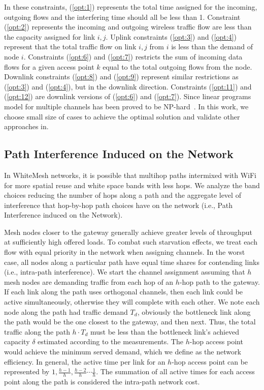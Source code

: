 In these constraints, (\ref{opt:1}) represents the total time assigned for the incoming, outgoing flows 
and the interfering time should all be less than 1. Constraint (\ref{opt:2}) represents the incoming and 
outgoing wireless traffic flow are less than the capacity assigned for link $i,j$. Uplink constraints 
(\ref{opt:3}) and (\ref{opt:4}) represent that the total traffic flow on link $i,j$ from $i$ is less than 
the demand of node $i$. Constraints (\ref{opt:6}) and (\ref{opt:7}) restricts the sum of incoming data 
flows for a given access point $k$ equal to the total outgoing flows from the node. Downlink constraints 
(\ref{opt:8}) and (\ref{opt:9}) represent similar restrictions as (\ref{opt:3}) and (\ref{opt:4}), but 
in the downlink direction.  Constraints (\ref{opt:11}) and (\ref{opt:12}) are downlink versions of 
(\ref{opt:6}) and (\ref{opt:7}).
Since linear programs model for multiple channels has been proved to be NP-hard~\cite{yuan2006cross}. 
In this work, we choose small size of cases to achieve the optimal solution and validate other
approaches in.






%
\subsection{Path Interference Induced on the Network}
\label{subsec:PEN}

In WhiteMesh networks, it is possible that multihop paths intermixed with WiFi for more spatial reuse 
and white space bands with less hops. We analyze the band choices reducing the number of hops along 
a path and the aggregate level of interference that hop-by-hop path choices have on the network (i.e., Path 
Interference induced on the Network).

Mesh nodes closer to the gateway generally achieve greater levels of throughput at sufficiently high 
offered loads. To combat such starvation effects, we treat each flow with equal priority in the network 
when assigning channels. In the worst case, all nodes along a particular path have equal time shares for 
contending links (i.e., intra-path interference). We start the channel assignment assuming that $h$ mesh 
nodes are demanding traffic from each hop of an $h$-hop path to the gateway. If each link along the path 
uses orthogonal channels, then each link could be active simultaneously, otherwise they will complete with 
each other. We note each node along the path had traffic demand $T_d$, obviously the bottleneck link 
along the path would be the one closest to the gateway, and then next. Thus, the total traffic along the 
path $h \cdot T_d$ must be less than the bottleneck link's achieved capacity $\delta$ estimated according 
to the measurements. The $h$-hop access point would achieve the minimum served demand, which we define as the 
network efficiency. In general, the active time per link for an $h$-hop access point can be represented by 
$1,\frac{h-1}{h},\frac{h-2}{h}\cdots \frac{1}{h}$. The summation of all active times for each access point 
along the path is considered the intra-path network cost.


